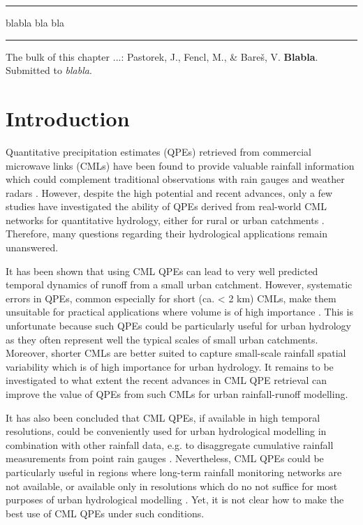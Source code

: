 \documentclass{ctuthesis}\usepackage[]{graphicx}\usepackage[]{color}
\begin{document}
\rule{\textwidth}{0.4pt}
blabla
bla bla
\newline
\rule[0.2cm]{\textwidth}{0.4pt}
{\footnotesize The bulk of this chapter ...: \newline
\-\hspace{0.5cm}
Pastorek, J., Fencl, M., \& Bareš, V. \textbf{Blabla}. Submitted to \emph{blabla}. 
}



\section{Introduction}

Quantitative precipitation estimates (QPEs) retrieved from commercial microwave links (CMLs) have been found to provide valuable rainfall information which could complement traditional observations with rain gauges and weather radars \citep{chwalaCommercialMicrowaveLink2019, gossetImprovingRainfallMeasurement2016, imhoffRainfallNowcastingUsing2020, riosgaonaRainfallRetrievalCommercial2018, uijlenhoetOpportunisticRemoteSensing2018}. However, despite the high potential and recent advances, only a few studies have investigated the ability of QPEs derived from real-world CML networks for quantitative hydrology, either for rural \citep{brauerEffectDifferencesRainfall2016, cazzanigaCalculatingHydrologicalResponse2020, smiatekPotentialCommercialMicrowave2017} or urban catchments \citep{dischImpactDifferentSources2019, pastorekCommercialMicrowaveLinks2019, stranskyRunoffPredictionUsing2018}. Therefore, many questions regarding their hydrological applications remain unanswered.

It has been shown that using CML QPEs can lead to very well predicted temporal dynamics of runoff from a small urban catchment. However, systematic errors in QPEs, common especially for short (ca. < 2 km) CMLs, make them unsuitable for practical applications where volume is of high importance \citep[][Chapter \ref{chap5}]{pastorekCommercialMicrowaveLinks2019}. This is unfortunate because such QPEs could be particularly useful for urban hydrology as they often represent well the typical scales of small urban catchments. Moreover, shorter CMLs are better suited to capture small-scale rainfall spatial variability which is of high importance for urban hydrology. It remains to be investigated to what extent the recent advances in CML QPE retrieval can improve the value of QPEs from such CMLs for urban rainfall-runoff modelling.

It has also been concluded that CML QPEs, if available in high temporal resolutions, could be conveniently used for urban hydrological modelling in combination with other rainfall data, e.g. to disaggregate cumulative rainfall measurements from point rain gauges \citep{dischImpactDifferentSources2019, stranskyRunoffPredictionUsing2018}. Nevertheless, CML QPEs could be particularly useful in regions where long-term rainfall monitoring networks are not available, or available only in resolutions which do no not suffice for most purposes of urban hydrological modelling \citep{gossetImprovingRainfallMeasurement2016}. Yet, it is not clear how to make the best use of  CML QPEs under such conditions.
\end{document}

